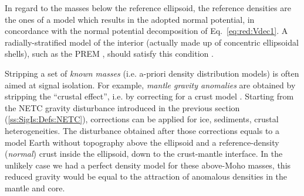 In regard to the masses below the reference ellipsoid, the reference densities are the ones of a model which results in the adopted normal potential, in concordance with the normal potential decomposition of Eq.~\ref{eq:red:Vdec1}.
A radially-stratified model of the interior (actually made up of concentric ellipsoidal shells), such as the PREM \parencite[Preliminary Reference Earth Model,][]{Dziewonski1981}, should satisfy this condition \parencite{Tscherning1981}.

Stripping a set of \textit{known masses} (i.e. a-priori density distribution models) is often aimed at signal isolation.
For example, \textit{mantle gravity anomalies} \parencites[e.g.][]{Mooney2010}{Kaban2014} are obtained by stripping the ``crustal effect'', i.e. by correcting for a crust model \parencite[e.g. {CRUST1.0},][]{Laske2012Crust10}.
Starting from the NETC gravity disturbance introduced in the previous section (\ref{ss:SigIs:Defs:NETC}), corrections can be applied for ice, sediments, crustal heterogeneities.
The disturbance obtained after those corrections equals to a model Earth without topography above the ellipsoid and a reference-density (\textit{normal}) crust inside the ellipsoid, down to the crust-mantle interface.
In the unlikely case we had a perfect density model for these above-Moho masses, this reduced gravity would be equal to the attraction of anomalous densities in the mantle and core.


